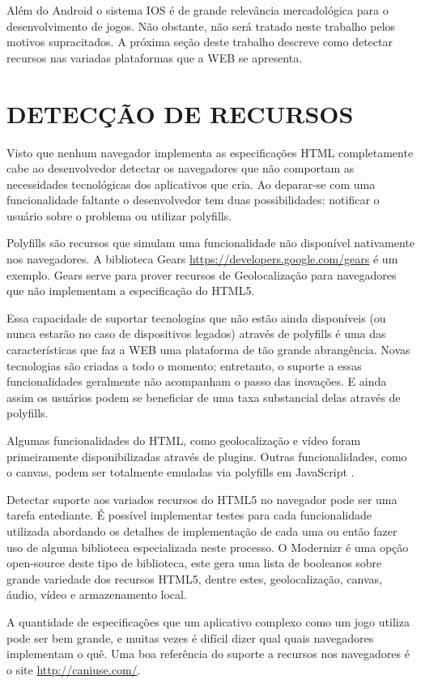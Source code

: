 Além do Android o sistema IOS é de grande relevância mercadológica
para o desenvolvimento de jogos. Não obstante, não será tratado neste
trabalho pelos motivos supracitados. A próxima seção deste trabalho
descreve como detectar recursos nas variadas plataformas que a WEB se
apresenta.

\section{DETECÇÃO DE RECURSOS}
Visto que nenhum navegador implementa as especificações HTML
completamente cabe ao desenvolvedor detectar os navegadores que não
comportam as necessidades tecnológicas dos aplicativos que cria. Ao
deparar-se com uma funcionalidade faltante o desenvolvedor tem duas
possibilidades: notificar o usuário sobre o problema ou utilizar
polyfills.

Polyfills são recursos que simulam uma funcionalidade não
disponível nativamente nos navegadores. A biblioteca Gears
\url{https://developers.google.com/gears} é um exemplo. Gears
serve para prover recursos de Geolocalização para navegadores que
não implementam a especificação do HTML5.

Essa capacidade de suportar tecnologias que não estão ainda
disponíveis (ou nunca estarão no caso de dispositivos legados)
através de polyfills é uma das características que faz a WEB uma
plataforma de tão grande abrangência. Novas tecnologias são criadas a
todo o momento; entretanto, o suporte a essas funcionalidades geralmente
não acompanham o passo das inovações. E ainda assim os usuários
podem se beneficiar de uma taxa substancial delas através de polyfills.

Algumas funcionalidades do HTML, como geolocalização e vídeo
foram primeiramente disponibilizadas através de plugins. Outras
funcionalidades, como o canvas, podem ser totalmente emuladas via
polyfills em JavaScript \autocite{diveIntohtml}.

Detectar suporte aos variados recursos do HTML5 no navegador
pode ser uma tarefa entediante. É possível implementar testes para
cada funcionalidade utilizada abordando os detalhes de implementação
de cada uma ou então fazer uso de alguma biblioteca especializada
neste processo. O Modernizr é uma opção open-source deste tipo de
biblioteca, este gera uma lista de booleanos sobre grande variedade dos
recursos HTML5, dentre estes, geolocalização, canvas, áudio, vídeo e
armazenamento local.

A quantidade de especificações que um aplicativo complexo como um jogo
utiliza pode ser bem grande, e muitas vezes é difícil dizer qual quais
navegadores implementam o quê. Uma boa referência do suporte a recursos
nos navegadores é o site \url{http://caniuse.com/}.

